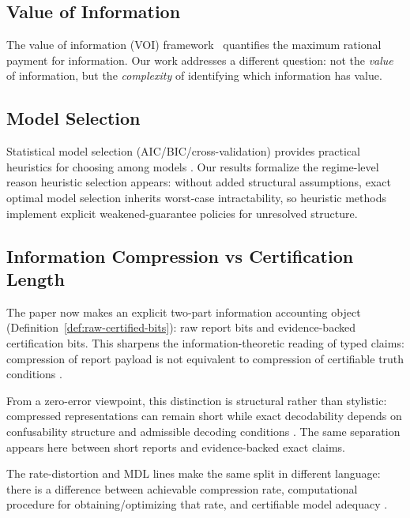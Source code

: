 \subsection{Value of Information}

The value of information (VOI) framework~\cite{howard1966information,raiffa1961applied} quantifies the maximum rational payment for information. Our work addresses a different question: not the \emph{value} of information, but the \emph{complexity} of identifying which information has value.

\subsection{Model Selection}

Statistical model selection (AIC/BIC/cross-validation) provides practical heuristics for choosing among models \cite{akaike1974new,schwarz1978estimating,stone1974cross}. Our results formalize the regime-level reason heuristic selection appears: without added structural assumptions, exact optimal model selection inherits worst-case intractability, so heuristic methods implement explicit weakened-guarantee policies for unresolved structure.

\subsection{Information Compression vs Certification Length}

The paper now makes an explicit two-part information accounting object (Definition~\ref{def:raw-certified-bits}): raw report bits and evidence-backed certification bits. This sharpens the information-theoretic reading of typed claims: compression of report payload is not equivalent to compression of certifiable truth conditions \cite{shannon1948mathematical,cover2006elements,slepian1973noiseless}.

From a zero-error viewpoint, this distinction is structural rather than stylistic: compressed representations can remain short while exact decodability depends on confusability structure and admissible decoding conditions \cite{shannon1956zero,korner1973graphs,lovasz1979shannon,csiszar2011information}. The same separation appears here between short reports and evidence-backed exact claims.

The rate-distortion and MDL lines make the same split in different language: there is a difference between achievable compression rate, computational procedure for obtaining/optimizing that rate, and certifiable model adequacy \cite{shannon1959coding,blahut1972computation,rissanen1978modeling,grunwald2007minimum,li2008introduction}.

